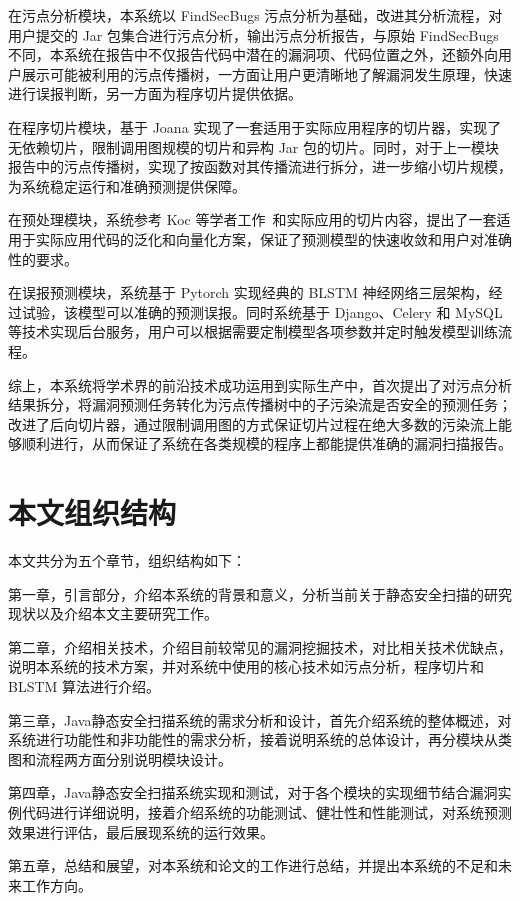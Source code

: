 在污点分析模块，本系统以 FindSecBugs 污点分析为基础，改进其分析流程，对用户提交的 Jar 包集合进行污点分析，输出污点分析报告，与原始 FindSecBugs 不同，本系统在报告中不仅报告代码中潜在的漏洞项、代码位置之外，还额外向用户展示可能被利用的污点传播树，一方面让用户更清晰地了解漏洞发生原理，快速进行误报判断，另一方面为程序切片提供依据。

在程序切片模块，基于 Joana 实现了一套适用于实际应用程序的切片器，实现了无依赖切片，限制调用图规模的切片和异构 Jar 包的切片。同时，对于上一模块报告中的污点传播树，实现了按函数对其传播流进行拆分，进一步缩小切片规模，为系统稳定运行和准确预测提供保障。

在预处理模块，系统参考 Koc 等学者工作~\cite{Koc2019}和实际应用的切片内容，提出了一套适用于实际应用代码的泛化和向量化方案，保证了预测模型的快速收敛和用户对准确性的要求。

在误报预测模块，系统基于 Pytorch 实现经典的 BLSTM 神经网络三层架构，经过试验，该模型可以准确的预测误报。同时系统基于 Django、Celery 和 MySQL 等技术实现后台服务，用户可以根据需要定制模型各项参数并定时触发模型训练流程。

综上，本系统将学术界的前沿技术成功运用到实际生产中，首次提出了对污点分析结果拆分，将漏洞预测任务转化为污点传播树中的子污染流是否安全的预测任务；改进了后向切片器，通过限制调用图的方式保证切片过程在绝大多数的污染流上能够顺利进行，从而保证了系统在各类规模的程序上都能提供准确的漏洞扫描报告。

\section{本文组织结构}
本文共分为五个章节，组织结构如下：

第一章，引言部分，介绍本系统的背景和意义，分析当前关于静态安全扫描的研究现状以及介绍本文主要研究工作。

第二章，介绍相关技术，介绍目前较常见的漏洞挖掘技术，对比相关技术优缺点，说明本系统的技术方案，并对系统中使用的核心技术如污点分析，程序切片和 BLSTM 算法进行介绍。

第三章，Java静态安全扫描系统的需求分析和设计，首先介绍系统的整体概述，对系统进行功能性和非功能性的需求分析，接着说明系统的总体设计，再分模块从类图和流程两方面分别说明模块设计。

第四章，Java静态安全扫描系统实现和测试，对于各个模块的实现细节结合漏洞实例代码进行详细说明，接着介绍系统的功能测试、健壮性和性能测试，对系统预测效果进行评估，最后展现系统的运行效果。

第五章，总结和展望，对本系统和论文的工作进行总结，并提出本系统的不足和未来工作方向。